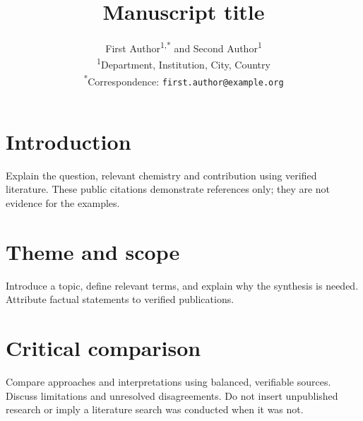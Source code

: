 \documentclass[a4paper,10pt,twocolumn]{article}
\title{Manuscript title}
\author{First Author\textsuperscript{1,*} and Second Author\textsuperscript{1}\\
\small \textsuperscript{1}Department, Institution, City, Country\\
\small \textsuperscript{*}Correspondence: \texttt{first.author@example.org}}
\date{}
\begin{document}
\section{Introduction}
Explain the question, relevant chemistry and contribution using verified
literature. These public citations demonstrate references only; they are not
evidence for the examples.\cite{wilkinson2016fair,peng2011reproducible}
\section{Theme and scope}
Introduce a topic, define relevant terms, and explain why the synthesis is
needed. Attribute factual statements to verified publications.
\section{Critical comparison}
Compare approaches and interpretations using balanced, verifiable sources.
Discuss limitations and unresolved disagreements. Do not insert unpublished
research or imply a literature search was conducted when it was not.
\end{document}
